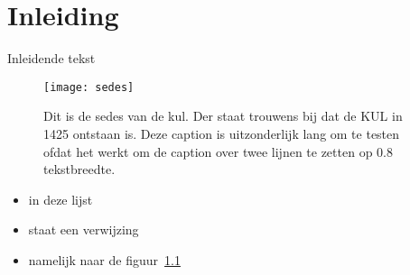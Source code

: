 
\chapter{Inleiding}
\label{cha:inleiding}

Inleidende tekst
\begin{figure}
  \centering
  \texttt{[image: sedes]}
  \caption{Dit is de sedes van  de kul. Der staat trouwens bij dat de KUL  in 1425 ontstaan is. Deze
    caption is  uitzonderlijk lang om te  testen ofdat het werkt  om de caption over  twee lijnen te
    zetten op 0.8 tekstbreedte.}
  \label{fig:sedes}
\end{figure}

\begin{itemize}
\item in deze lijst
\item staat een verwijzing
\item namelijk naar de figuur~\ref{fig:sedes}
\end{itemize}

